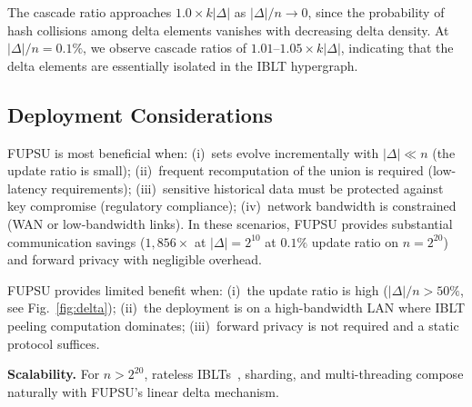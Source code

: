 The cascade ratio approaches $1.0 \times k|\Delta|$ as $|\Delta|/n \to
0$, since the probability of hash collisions among delta elements
vanishes with decreasing delta density. At $|\Delta|/n = 0.1\%$, we
observe cascade ratios of $1.01$--$1.05 \times k|\Delta|$, indicating
that the delta elements are essentially isolated in the IBLT hypergraph.

\subsection{Deployment Considerations}
\label{sec:deployment}

FUPSU is most beneficial when: (i)~sets evolve incrementally with
$|\Delta| \ll n$ (the update ratio is small); (ii)~frequent
recomputation of the union is required (low-latency requirements);
(iii)~sensitive historical data must be protected against key compromise
(regulatory compliance); (iv)~network bandwidth is constrained (WAN or
low-bandwidth links). In these scenarios, FUPSU provides substantial
communication savings ($1{,}856\times$ at $|\Delta|=2^{10}$ at $0.1\%$ update ratio on $n=2^{20}$) and forward
privacy with negligible overhead.

FUPSU provides limited benefit when: (i)~the update ratio is high
($|\Delta|/n > 50\%$, see Fig.~\ref{fig:delta}); (ii)~the
deployment is on a high-bandwidth LAN where IBLT peeling computation
dominates; (iii)~forward privacy is not required and a static protocol
suffices.

\smallskip\noindent\textbf{Scalability.}
For $n > 2^{20}$, rateless IBLTs~\cite{YGA24}, sharding, and
multi-threading compose naturally with FUPSU's linear delta mechanism.


